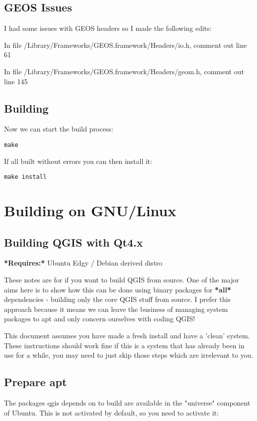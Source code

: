 \subsection{GEOS Issues}
I had some issues with GEOS headers so I made the following edits:

In file /Library/Frameworks/GEOS.framework/Headers/io.h, comment out line 61

In file /Library/Frameworks/GEOS.framework/Headers/geom.h, comment out line 145

\subsection{Building}
Now we can start the build process:

\begin{verbatim}
make 
\end{verbatim}

If all built without errors you can then install it:

\begin{verbatim}
make install 
\end{verbatim}


\section{Building on GNU/Linux}
\subsection{Building QGIS with Qt4.x}
\textbf{*Requires:*} Ubuntu Edgy / Debian derived distro

These notes are for if you want to build QGIS from source. One of the major
aims here is to show how this can be done using binary packages for \textbf{*all*}
dependencies - building only the core QGIS stuff from source. I prefer this
approach because it means we can leave the business of managing system packages
to apt and only concern ourselves with coding QGIS! 

This document assumes you have made a fresh install and have a 'clean' system.
These instructions should work fine if this is a system that has already been
in use for a while, you may need to just skip those steps which are irrelevant
to you.

\subsection{Prepare apt}
The packages qgis depends on to build are available in the "universe" component
of Ubuntu. This is not activated by default, so you need to activate it:

